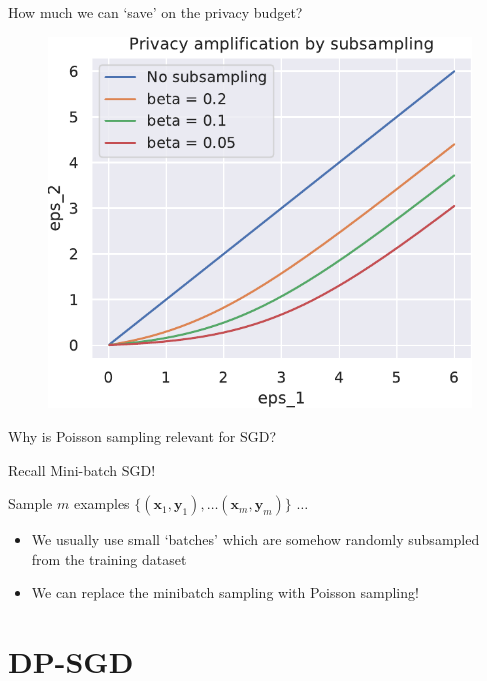 \documentclass[12pt,aspectratio=169,handout]{beamer}
\begin{document}
\begin{frame}{How much we can `save' on the privacy budget?}

\begin{figure}
\includegraphics[width=0.7\linewidth]{img/privacy-amplification-01.pdf}
\end{figure}


\end{frame}



\begin{frame}{Why is Poisson sampling relevant for SGD?}

Recall Mini-batch SGD!

\begin{algorithmic}[1]
\State Sample $m$ examples $\{ (\bm{x}_1, \bm{y}_1), \ldots (\bm{x}_m, \bm{y}_m) \}$
\State $\ldots$
\EndWhile
\EndFunction
\end{algorithmic}


\begin{itemize}
\item We usually use small `batches' which are somehow randomly subsampled from the training dataset
\item We can replace the minibatch sampling with Poisson sampling!
\end{itemize}


\end{frame}


\section{DP-SGD}
\end{document}
